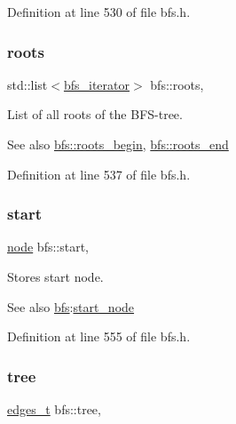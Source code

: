 Definition at line 530 of file bfs.\+h.

\mbox{\label{classbfs_acea071a6fdad8e590b40830ced241824}} 
\subsubsection{\texorpdfstring{roots}{roots}}
{\footnotesize\ttfamily std\+::list$<$\mbox{\hyperlink{classbfs_a1035f068a96de0370789ec315aef4f73}{bfs\+\_\+iterator}}$>$ bfs\+::roots\hspace{0.3cm}{\ttfamily [protected]}, {\ttfamily [inherited]}}



List of all roots of the B\+F\+S-\/tree. 

\begin{DoxySeeAlso}{See also}
\mbox{\hyperlink{classbfs_a45d58d06d0dcd6427edad2ec52a6ebb9}{bfs\+::roots\+\_\+begin}}, \mbox{\hyperlink{classbfs_ac84b90f777adeb90390689db62602d73}{bfs\+::roots\+\_\+end}} 
\end{DoxySeeAlso}


Definition at line 537 of file bfs.\+h.

\mbox{\label{classbfs_af2ab561d9e60a9fc2e25b02d1f807f96}} 
\subsubsection{\texorpdfstring{start}{start}}
{\footnotesize\ttfamily \mbox{\hyperlink{classnode}{node}} bfs\+::start\hspace{0.3cm}{\ttfamily [protected]}, {\ttfamily [inherited]}}



Stores start node. 

\begin{DoxySeeAlso}{See also}
\mbox{\hyperlink{classbfs}{bfs}}\+:\mbox{\hyperlink{classbfs_a23e2981c2ee617a6e12a8833d2db6210}{start\+\_\+node}} 
\end{DoxySeeAlso}


Definition at line 555 of file bfs.\+h.

\mbox{\label{classbfs_a8bc83afea6d1066ea4ceca3007799912}} 
\subsubsection{\texorpdfstring{tree}{tree}}
{\footnotesize\ttfamily \mbox{\hyperlink{edge_8h_a8f9587479bda6cf612c103494b3858e3}{edges\+\_\+t}} bfs\+::tree\hspace{0.3cm}{\ttfamily [protected]}, {\ttfamily [inherited]}}



